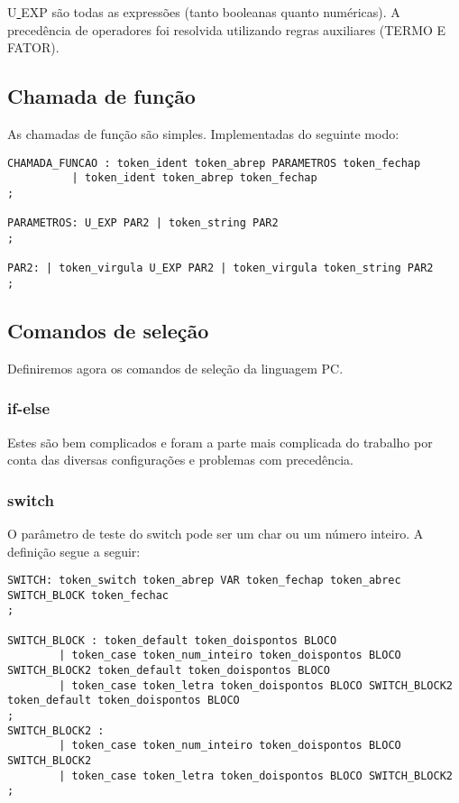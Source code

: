 \documentclass[a4paper,10pt]{article}
\begin{document}
U\underline{ }EXP são todas as expressões (tanto booleanas quanto numéricas). A precedência de operadores foi resolvida utilizando regras auxiliares (TERMO E FATOR).

\subsection{Chamada de função}

As chamadas de função são simples. Implementadas do seguinte modo:

\begin{verbatim}
CHAMADA_FUNCAO : token_ident token_abrep PARAMETROS token_fechap
		  | token_ident token_abrep token_fechap
;

PARAMETROS: U_EXP PAR2 | token_string PAR2
;

PAR2: | token_virgula U_EXP PAR2 | token_virgula token_string PAR2
;

\end{verbatim}

\subsection{Comandos de seleção}

Definiremos agora os comandos de seleção da linguagem PC.

\subsubsection{if-else}

Estes são bem complicados e foram a parte mais complicada do trabalho por conta das diversas configurações e problemas com precedência.

\subsubsection{switch}

O parâmetro de teste do switch pode ser um char ou um número inteiro. A definição segue a seguir:

\begin{verbatim}
SWITCH: token_switch token_abrep VAR token_fechap token_abrec SWITCH_BLOCK token_fechac
;

SWITCH_BLOCK : token_default token_doispontos BLOCO 
		| token_case token_num_inteiro token_doispontos BLOCO SWITCH_BLOCK2 token_default token_doispontos BLOCO
		| token_case token_letra token_doispontos BLOCO SWITCH_BLOCK2 token_default token_doispontos BLOCO
;
SWITCH_BLOCK2 : 
		| token_case token_num_inteiro token_doispontos BLOCO SWITCH_BLOCK2
		| token_case token_letra token_doispontos BLOCO SWITCH_BLOCK2 
;
\end{verbatim}
\end{document}
